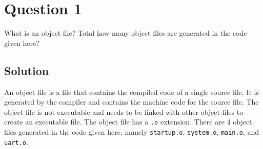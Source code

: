 \section*{Question 1}

What is an object file?
Total how many object files are generated in the code given here?

\subsection*{Solution}

An object file is a file that contains the compiled code of a single source file.
It is generated by the compiler and contains the machine code for the source file.
The object file is not executable and needs to be linked with other object files to create an executable file.
The object file has a \texttt{.o} extension.
There are 4 object files generated in the code given here, namely \texttt{startup.o}, \texttt{system.o}, \texttt{main.o}, and \texttt{uart.o}.
